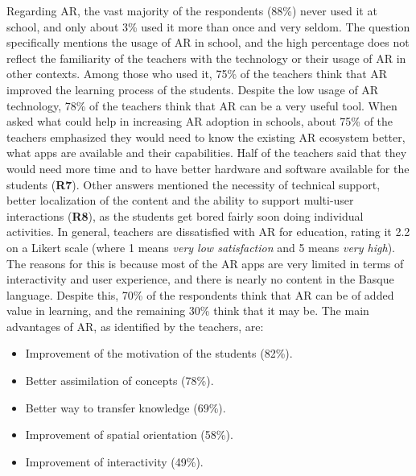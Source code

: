 Regarding AR, the vast majority of the respondents (88\%) never used it at school, and only about 3\% used it more than once and very seldom. The question specifically mentions the usage of AR in school, and the high percentage does not reflect the familiarity of the teachers with the technology or their usage of AR in other contexts. Among those who used it, 75\% of the teachers think that AR improved the learning process of the students. Despite the low usage of AR technology, 78\% of the teachers think that AR can be a very useful tool. When asked what could help in increasing AR adoption in schools, about 75\% of the teachers emphasized they would need to know the existing AR ecosystem better, what apps are available and their capabilities. Half of the teachers said that they would need more time and to have better hardware and software available for the students (\textbf{R7}). Other answers mentioned the necessity of technical support, better localization of the content and the ability to support multi-user interactions (\textbf{R8}), as the students get bored fairly soon doing individual activities. In general, teachers are dissatisfied with AR for education, rating it 2.2 on a Likert scale (where 1 means \textit{very low satisfaction} and 5 means \textit{very high}). The reasons for this is because most of the AR apps are very limited in terms of interactivity and user experience, and there is nearly no content in the Basque language. Despite this, 70\% of the respondents think that AR can be of added value in learning, and the remaining 30\% think that it may be. The main advantages of AR, as identified by the teachers, are:
\begin{itemize}
        \item Improvement of the motivation of the students (82\%).
        \item Better assimilation of concepts (78\%).
        \item Better way to transfer knowledge (69\%).
        \item Improvement of spatial orientation (58\%).
        \item Improvement of interactivity (49\%).
\end{itemize}


